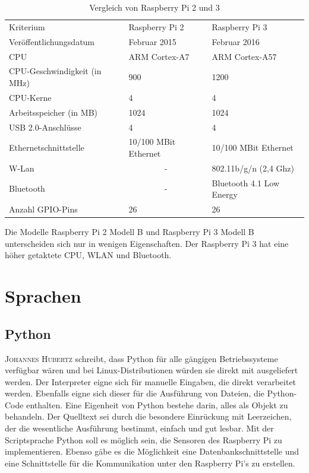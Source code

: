 \begin{table}[h]
\centering
\caption{Vergleich von Raspberry Pi 2 und 3 \cite{CortexA7} \cite{CortexA57}}
\label{tab:VergleichRaspberry}
\begin{tabular}{lll}
Kriterium                    & Raspberry Pi 2        					& Raspberry Pi 3           \\
Veröffentlichungsdatum       & Februar 2015          					& Februar 2016             \\
CPU                          & ARM Cortex-A7   & ARM Cortex-A57           \\
CPU-Geschwindigkeit (in MHz) & 900             & 1200                     \\
CPU-Kerne                    & 4                              & 4                        \\
Arbeitsspeicher (in MB)      & 1024                  					& 1024                     \\
USB 2.0-Anschlüsse           & 4                     					& 4                        \\
Ethernetschnittstelle        & 10/100 MBit Ethernet  					& 10/100 MBit Ethernet     \\
W-Lan                        & \multicolumn{1}{c}{-} 					& 802.11b/g/n (2,4 Ghz)    \\
Bluetooth                    & \multicolumn{1}{c}{-} 					& Bluetooth 4.1 Low Energy \\
Anzahl GPIO-Pins             & 26                    					& 26                      
\end{tabular}
\end{table}
 
Die Modelle Raspberry Pi 2 Modell B und Raspberry Pi 3 Modell B unterscheiden sich nur in wenigen Eigenschaften. Der Raspberry Pi 3 hat eine höher getaktete CPU, WLAN und Bluetooth.

\section{Sprachen}

\subsection{Python}\label{Python}
\textsc{Johannes Hubertz}\cite{hubertz2016softwaretests} schreibt, dass Python für alle gängigen Betriebssysteme verfügbar wären und bei Linux-Distributionen würden sie direkt mit ausgeliefert werden. Der Interpreter eigne sich für manuelle Eingaben, die direkt verarbeitet werden. Ebenfalls eigne sich dieser für die Ausführung von Dateien, die Python-Code enthalten. Eine Eigenheit von Python bestehe darin, alles als Objekt zu behandeln. Der Quelltext sei durch die besondere Einrückung mit Leerzeichen, der die wesentliche Ausführung bestimmt, einfach und gut lesbar.  Mit der Scriptsprache Python soll es möglich sein, die Sensoren des Raspberry Pi zu implementieren. Ebenso gäbe es die Möglichkeit eine Datenbankschnittstelle und eine Schnittstelle für die Kommunikation unter den Raspberry Pi's zu erstellen.

